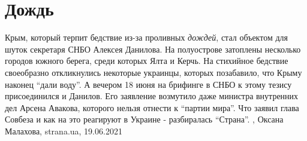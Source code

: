  
 
 
 
 
\chapter{Дождь}

Крым, который терпит бедствие из-за проливных \emph{дождей}, стал объектом для шуток
секретаря СНБО Алексея Данилова. 
На полуострове затоплены несколько городов южного берега, среди которых Ялта и
Керчь. На стихийное бедствие своеобразно откликнулись некоторые украинцы,
которых позабавило, что Крыму наконец \enquote{дали воду}.
А вечером 18 июня на брифинге в СНБО к этому тезису присоединился и Данилов.
Его заявление возмутило даже министра внутренних дел Арсена Авакова, которого
нельзя отнести к \enquote{партии мира}. 
Что заявил глава Совбеза и как на это реагируют в Украине - разбиралась
\enquote{Страна}.
, 
Оксана Малахова, strana.ua, 19.06.2021
